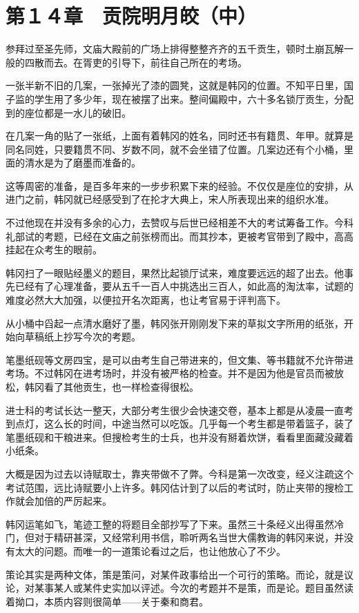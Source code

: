 \section{第１４章　贡院明月皎（中）}

参拜过至圣先师，文庙大殿前的广场上排得整整齐齐的五千贡生，顿时土崩瓦解一般的四散而去。在胥吏的引导下，前往自己所在的考场。

一张半新不旧的几案，一张掉光了漆的圆凳，这就是韩冈的位置。不知平日里，国子监的学生用了多少年，现在被摆了出来。整间偏殿中，六十多名锁厅贡生，分配到的座位都是一水儿的破旧。

在几案一角的贴了一张纸，上面有着韩冈的姓名，同时还书有籍贯、年甲。就算是同名同姓，只要籍贯不同、岁数不同，就不会坐错了位置。几案边还有个小桶，里面的清水是为了磨墨而准备的。

这等周密的准备，是百多年来的一步步积累下来的经验。不仅仅是座位的安排，从进门之前，韩冈就已经感受到了在抡才大典上，宋人所表现出来的组织水准。

不过他现在并没有多余的心力，去赞叹与后世已经相差不大的考试筹备工作。今科礼部试的考题，已经在文庙之前张榜而出。而其抄本，更被考官带到了殿中，高高挂起在众考生的眼前。

韩冈扫了一眼贴经墨义的题目，果然比起锁厅试来，难度要远远的超了出去。他事先已经有了心理准备，要从五千一百人中挑选出三百人，如此高的淘汰率，试题的难度必然大大加强，以便拉开名次距离，也让考官易于评判高下。

从小桶中舀起一点清水磨好了墨，韩冈张开刚刚发下来的草拟文字所用的纸张，开始向草稿纸上抄写今次的考题。

笔墨纸砚等文房四宝，是可以由考生自己带进来的，但文集、等书籍就不允许带进考场。不过韩冈在进考场时，并没有被严格的检查。并不是因为他是官员而被放松，韩冈看了其他贡生，也一样检查得很松。

进士科的考试长达一整天，大部分考生很少会快速交卷，基本上都是从凌晨一直考到点灯，这么长的时间，中途当然可以吃饭。几乎每一个考生都是带着篮子，装了笔墨纸砚和干粮进来。但搜检考生的士兵，也并没有掰着炊饼，看看里面藏没藏着小纸条。

大概是因为过去以诗赋取士，靠夹带做不了弊。今科是第一次改变，经义注疏这个考试范围，远比诗赋要小上许多。韩冈估计到了以后的考试时，防止夹带的搜检工作就会加倍的严厉起来。

韩冈运笔如飞，笔迹工整的将题目全部抄写了下来。虽然三十条经义出得虽然冷门，但对于精研甚深，又经常利用书信，聆听两名当世大儒教诲的韩冈来说，并没有太大的问题。而唯一的一道策论看过之后，也让他放心了不少。

策论其实是两种文体，策是策问，对某件政事给出一个可行的策略。而论，就是议论，对某事某人或某件史实加以评述。今次的考题并不是策，而是论。题目虽然读着拗口，本质内容则很简单——关于秦和商君。

